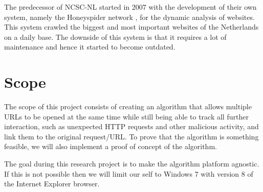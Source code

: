 \documentclass{scrartcl}
\begin{document}
The predecessor of NCSC-NL started in 2007 with the development of their own system, namely the Honeyspider network \cite{honeyspider}, for the dynamic analysis of websites. This system crawled the biggest and most important websites of the Netherlands on a daily base. The downside of this system is that it requires a lot of maintenance and hence it started to become outdated.





\section{Scope}

The scope of this project consists of creating an algorithm that allows multiple URLs to be opened at the same time while still being able to track all further interaction, such as unexpected HTTP requests and other malicious activity, and link them to the original request/URL. To prove that the algorithm is something feasible, we will also implement a proof of concept of the algorithm.

The goal during this research project is to make the algorithm platform agnostic. If this is not possible then we will limit our self to Windows 7 with version 8 of the Internet Explorer browser.
\end{document}
